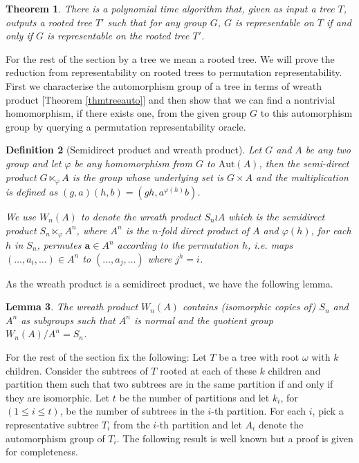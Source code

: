 \documentclass[a4paper,11pt]{article}
\newtheorem{theorem}{Theorem}[section]
\newtheorem{lemma}[theorem]{Lemma}
\newtheorem{definition}[theorem]{Definition}
\newcommand{\Aut}[1]{\ensuremath{\mathrm{Aut}\left(#1\right)}}
\begin{document}
\begin{theorem}
  There is a polynomial time algorithm that, given as input a tree $T$,
  outputs a rooted tree $T'$ such that for any group $G$, $G$ is
  representable on $T$ if and only if $G$ is representable on the rooted tree
  $T'$.
\end{theorem}

For the rest of the section by a tree we mean a rooted tree. We will
prove the reduction from representability on rooted trees to
permutation representability. First we characterise the automorphism
group of a tree in terms of wreath product [Theorem \ref{thmtreeauto}]
and then show that we can find a nontrivial homomorphism, if there
exists one, from the given group $G$ to this automorphism group by
querying a permutation representability oracle.

\begin{definition}[Semidirect product and wreath product]
  Let $G$ and $A$ be any two group and let $\varphi$ be any
  homomorphism from $G$ to $\Aut{A}$, then the semi-direct product
  $G\ltimes_\varphi A$ is the group whose underlying set is $G\times
  A$ and the multiplication is defined as $(g,a) (h,b) = (gh,
  a^{\varphi(h)}b)$.
  
  We use $W_n(A)$ to denote the wreath product $S_n \wr A$ which is
  the semidirect product $S_n\ltimes_\varphi A^n$, where $A^n$ is the
  $n$-fold direct product of $A$ and ${\varphi(h)}$, for each $h$ in
  $S_n$, permutes $\mathbf{a} \in A^n$ according to the permutation
  $h$, i.e. maps $(\ldots,a_i,\ldots) \in A^n$ to
  $(\ldots,a_{j},\ldots)$ where $j^h = i$.
\end{definition}

As the wreath product is a semidirect product, we have the following
lemma.

\begin{lemma}\label{lem-wreath-property}
  The wreath product $W_n(A)$ contains (isomorphic copies of) $S_n$
  and $A^n$ as subgroups such that $A^n$ is normal and the quotient
  group $W_n(A)/A^n=S_n$.
\end{lemma}

For the rest of the section fix the following: Let $T$ be a tree with
root $\omega$ with $k$ children. Consider the subtrees of $T$ rooted
at each of these $k$ children and partition them such that two
subtrees are in the same partition if and only if they are
isomorphic. Let $t$ be the number of partitions and let $k_i$, for $(1
\leq i \leq t)$, be the number of subtrees in the $i$-th
partition. For each $i$, pick a representative subtree $T_i$ from the
$i$-th partition and let $A_i$ denote the automorphism group of
$T_i$. The following result is well known but a proof is given for
completeness.
\end{document}

